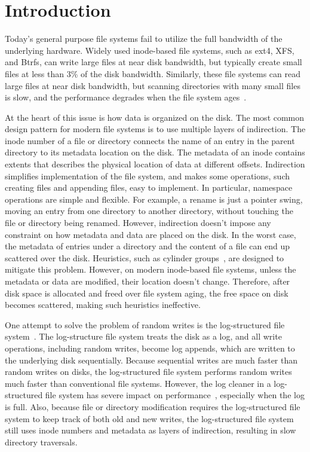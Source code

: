 \chapter{Introduction}
\label{chap:intro}

Today's general purpose file systems fail to utilize the full bandwidth of the
underlying hardware.
Widely used inode-based file systems, such as ext4, XFS, and Btrfs, can write
large files at near disk bandwidth,
but typically create small files at less than 3\% of the disk bandwidth.
Similarly, these file systems can read large files at near disk bandwidth,
but scanning directories with many small files is slow, and the performance
degrades when the file system ages~\citep{betrfs3}.

At the heart of this issue is how data is organized on the disk.
The most common design pattern for modern file systems is to use multiple layers
of indirection.
The inode number of a file or directory connects the name of an entry in the
parent directory to its metadata location on the disk.
The metadata of an inode contains extents that describes the physical location
of data at different offsets.
Indirection simplifies implementation of the file system, and makes some
operations, such creating files and appending files, easy to implement.
In particular, namespace operations are simple and flexible.
For example, a rename is just a pointer swing, moving an entry from one
directory to another directory, without touching the file or directory being
renamed.
However, indirection doesn't impose any constraint on how metadata and data
are placed on the disk.
In the worst case, the metadata of entries under a directory and the content of
a file can end up scattered over the disk.
Heuristics, such as cylinder groups~\citep{ffs1}, are designed to mitigate this
problem.
However, on modern inode-based file systems, unless the metadata or data are
modified, their location doesn't change.
Therefore, after disk space is allocated and freed over file system aging,
the free space on disk becomes scattered, making such heuristics ineffective.

One attempt to solve the problem of random writes is the log-structured file
system~\citep{lfs}.
The log-structure file system treats the disk as a log,
and all write operations, including random writes, become log appends,
which are written to the underlying disk sequentially.
Because sequential writes are much faster than random writes on disks,
the log-structured file system performs random writes much faster than
conventional file systems.
However, the log cleaner in a log-structured file system has severe impact on
performance~\citep{lfsbsd}, especially when the log is full.
Also, because file or directory modification requires the log-structured file
system to keep track of both old and new writes,
the log-structured file system still uses inode numbers and metadata as
layers of indirection, resulting in slow directory traversals.

